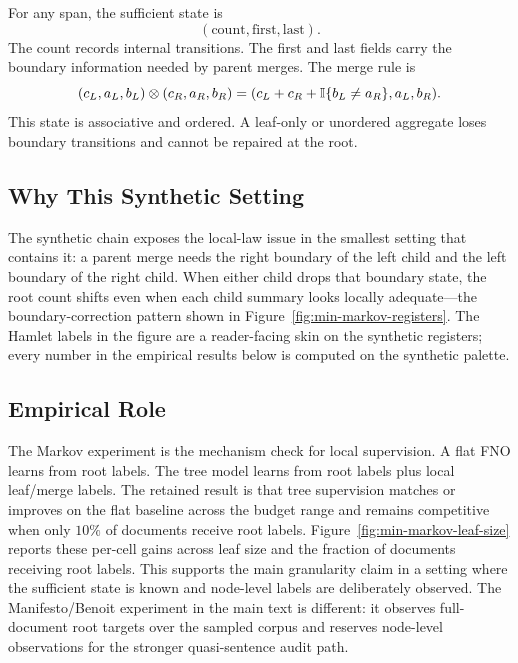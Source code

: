 For any span, the sufficient state is
\[
(\mathrm{count},\mathrm{first},\mathrm{last}).
\]
The count records internal transitions. The first and last fields carry the
boundary information needed by parent merges. The merge rule is
\[
(c_L,a_L,b_L)\otimes(c_R,a_R,b_R)
=
(c_L+c_R+\mathbb{I}\{b_L\ne a_R\},a_L,b_R).
\]
This state is associative and ordered. A leaf-only or unordered aggregate loses
boundary transitions and cannot be repaired at the root.

\subsection{Why This Synthetic Setting}

The synthetic chain exposes the local-law issue in the smallest setting
that contains it: a parent merge needs the right boundary of the left
child and the left boundary of the right child. When either child drops
that boundary state, the root count shifts even when each child summary
looks locally adequate---the boundary-correction pattern shown in
Figure~\ref{fig:min-markov-registers}. The Hamlet labels in the figure
are a reader-facing skin on the synthetic registers; every number in the
empirical results below is computed on the synthetic palette.

\subsection{Empirical Role}

The Markov experiment is the mechanism check for local supervision. A flat FNO
learns from root labels. The tree model learns from root labels plus local
leaf/merge labels. The retained result is that tree supervision matches or
improves on the flat baseline across the budget range and remains competitive
when only $10\%$ of documents receive root labels.
Figure~\ref{fig:min-markov-leaf-size} reports these per-cell gains across
leaf size and the fraction of documents receiving root labels.
This supports the main
granularity claim in a setting where the sufficient state is known and
node-level labels are deliberately observed. The Manifesto/Benoit experiment in
the main text is different: it observes full-document root targets over the
sampled corpus and reserves node-level observations for the stronger
quasi-sentence audit path.

